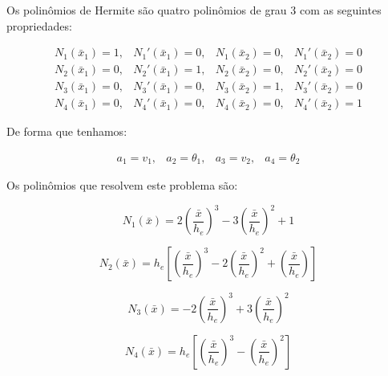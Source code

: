         Os polinômios de Hermite são quatro polinômios de grau 3 com as seguintes propriedades:

        \begin{equation*}
            \begin{array}{cccc}
                N_1(\bar{x}_1) = 1, & N_1'(\bar{x}_1) = 0, & N_1(\bar{x}_2) = 0, & N_1'(\bar{x}_2) = 0\\
                N_2(\bar{x}_1) = 0, & N_2'(\bar{x}_1) = 1, & N_2(\bar{x}_2) = 0, & N_2'(\bar{x}_2) = 0\\
                N_3(\bar{x}_1) = 0, & N_3'(\bar{x}_1) = 0, & N_3(\bar{x}_2) = 1, & N_3'(\bar{x}_2) = 0\\
                N_4(\bar{x}_1) = 0, & N_4'(\bar{x}_1) = 0, & N_4(\bar{x}_2) = 0, & N_4'(\bar{x}_2) = 1
            \end{array}
        \end{equation*}

        De forma que tenhamos:

        \begin{equation*}
            \begin{array}{cccc}
                a_1 = v_1, & a_2 = \theta_1, & a_3 = v_2, & a_4 = \theta_2
            \end{array}
        \end{equation*}

        Os polinômios que resolvem este problema são:

        \begin{equation*}
            N_1(\bar{x}) = 2 \left(\frac{\bar{x}}{h_e}\right)^3 - 3 \left(\frac{\bar{x}}{h_e}\right)^2 + 1
        \end{equation*}

        \begin{equation*}
            N_2(\bar{x}) = h_e \left[ \left(\frac{\bar{x}}{h_e}\right)^3 - 2 \left(\frac{\bar{x}}{h_e}\right)^2 + \left(\frac{\bar{x}}{h_e}\right) \right]
        \end{equation*}

        \begin{equation*}
            N_3(\bar{x}) = -2 \left(\frac{\bar{x}}{h_e}\right)^3 + 3 \left(\frac{\bar{x}}{h_e}\right)^2
        \end{equation*}

        \begin{equation*}
            N_4(\bar{x}) = h_e \left[ \left(\frac{\bar{x}}{h_e}\right)^3 - \left(\frac{\bar{x}}{h_e}\right)^2 \right]
        \end{equation*}


